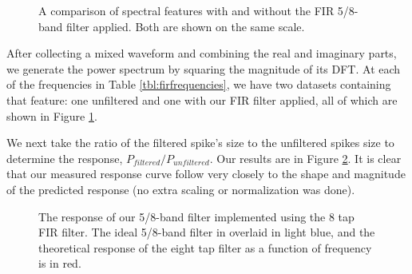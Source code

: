 \documentclass[12pt]{article}
\begin{document}
\begin{figure}[H]
\caption[SODUMB]{A comparison of spectral features with and without the FIR 5/8-band filter applied. Both are shown on the same scale.}
\label{fig:fircompare}
\end{figure}

After collecting a mixed waveform and combining the real and imaginary parts, we generate the power spectrum by squaring the magnitude of its DFT. At each of the frequencies in Table \ref{tbl:firfrequencies}, we have two datasets containing that feature: one unfiltered and one with our FIR filter applied, all of which are shown in Figure \ref{fig:fircompare}.

We next take the ratio of the filtered spike's size to the unfiltered spikes size to determine the response, $P_{filtered} / P_{unfiltered}$. Our results are in Figure \ref{fig:firresponse}. It is clear that our measured response curve follow very closely to the shape and magnitude of the predicted response (no extra scaling or normalization was done).

\begin{figure}[H]
\caption[SODUMB]{The response of our 5/8-band filter implemented using the 8 tap FIR filter. The ideal 5/8-band filter in overlaid in light blue, and the theoretical response of the eight tap filter as a function of frequency is in red.}
\label{fig:firresponse}
\end{figure}
\end{document}
